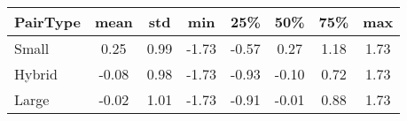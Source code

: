 
\begin{table}[htbp]
  \centering
    \begin{tabular}{lccccccc}
    \hline\hline
    PairType & mean  & std   & min   & 25\%  & 50\%  & 75\%  & max \\
    \hline
    Small & 0.25  & 0.99  & -1.73 & -0.57 & 0.27  & 1.18  & 1.73 \\
    Hybrid & -0.08 & 0.98  & -1.73 & -0.93 & -0.10 & 0.72  & 1.73 \\
    Large & -0.02 & 1.01  & -1.73 & -0.91 & -0.01 & 0.88  & 1.73 \\
    \hline\hline
    \end{tabular}%
  \label{tab:addlabel}%
\end{table}%
